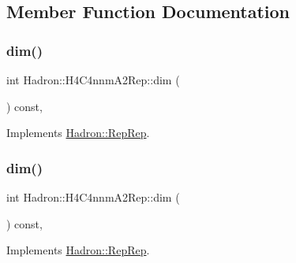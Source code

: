 \subsection{Member Function Documentation}
\mbox{\label{structHadron_1_1H4C4nnmA2Rep_a70814b73063ca353305cb82be8dd8b74}} 
\subsubsection{\texorpdfstring{dim()}{dim()}\hspace{0.1cm}{\footnotesize\ttfamily [1/5]}}
{\footnotesize\ttfamily int Hadron\+::\+H4\+C4nnm\+A2\+Rep\+::dim (\begin{DoxyParamCaption}{ }\end{DoxyParamCaption}) const\hspace{0.3cm}{\ttfamily [inline]}, {\ttfamily [virtual]}}



Implements \mbox{\hyperlink{structHadron_1_1RepRep_a92c8802e5ed7afd7da43ccfd5b7cd92b}{Hadron\+::\+Rep\+Rep}}.

\mbox{\label{structHadron_1_1H4C4nnmA2Rep_a70814b73063ca353305cb82be8dd8b74}} 
\subsubsection{\texorpdfstring{dim()}{dim()}\hspace{0.1cm}{\footnotesize\ttfamily [2/5]}}
{\footnotesize\ttfamily int Hadron\+::\+H4\+C4nnm\+A2\+Rep\+::dim (\begin{DoxyParamCaption}{ }\end{DoxyParamCaption}) const\hspace{0.3cm}{\ttfamily [inline]}, {\ttfamily [virtual]}}



Implements \mbox{\hyperlink{structHadron_1_1RepRep_a92c8802e5ed7afd7da43ccfd5b7cd92b}{Hadron\+::\+Rep\+Rep}}.

\mbox{\label{structHadron_1_1H4C4nnmA2Rep_a70814b73063ca353305cb82be8dd8b74}} 
